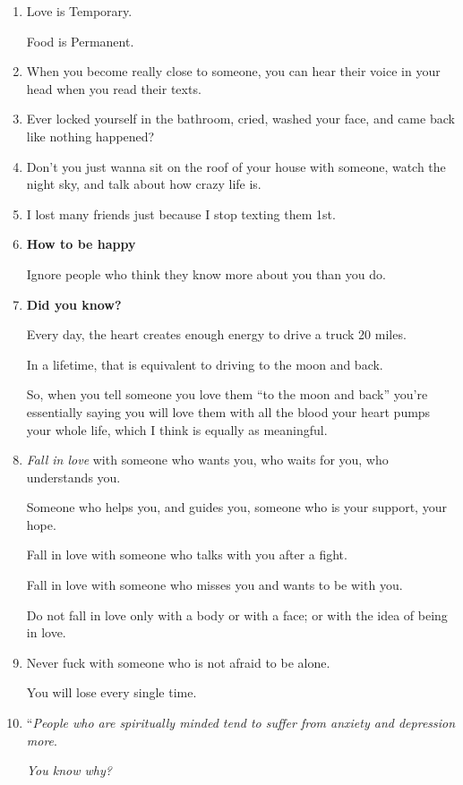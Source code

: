 \documentclass{article}
\numberwithin{equation}{section}
\begin{document}
\begin{enumerate}
    \textit{Sometimes the people you love the most, turn out to be the people you can trust the least}.'' - Trent Shalton
    \item Love is Temporary.
    
    Food is Permanent.
    \item When you become really close to someone, you can hear their voice in your head when you read their texts.
    \item Ever locked yourself in the bathroom, cried, washed your face, and came back like nothing happened?
    \item Don't you just wanna sit on the roof of your house with someone, watch the night sky, and talk about how crazy life is.
    \item I lost many friends just because I stop texting them 1st.
    \item \textbf{How to be happy}
    
    Ignore people who think they know more about you than you do.
    \item \textbf{Did you know?}
    
    Every day, the heart creates enough energy to drive a truck 20 miles.
    
    In a lifetime, that is equivalent to driving to the moon and back.
    
    So, when you tell someone you love them ``to the moon and back'' you're essentially saying you will love them with all the blood your heart pumps your whole life, which I think is equally as meaningful.
    \item \textit{Fall in love} with someone who wants you, who waits for you, who understands you.
    
    Someone who helps you, and guides you, someone who is your support, your hope.
    
    Fall in love with someone who talks with you after a fight.
    
    Fall in love with someone who misses you and wants to be with you.
    
    Do not fall in love only with a body or with a face; or with the idea of being in love.
    \item Never fuck with someone who is not afraid to be alone.
    
    You will lose every single  time.
    \item ``\textit{People who are spiritually minded tend to suffer from anxiety and depression more}.
    
    \textit{You know why?}
    

\end{enumerate}
\end{document}

